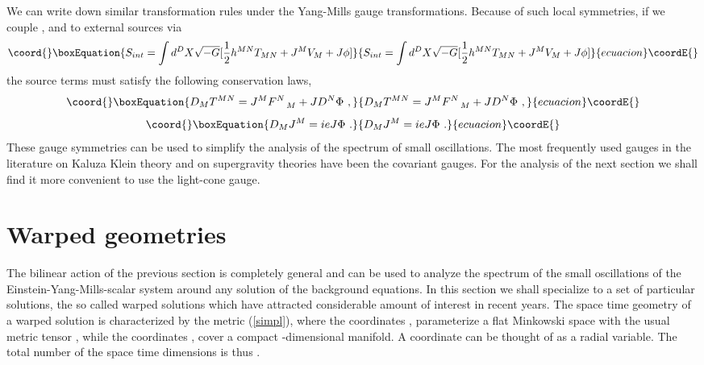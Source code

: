 \documentclass[a4paper,12pt]{article}
\begin{document}
We can write down similar transformation rules under the Yang-Mills
gauge transformations. Because of such local symmetries, if we couple
\coordHE{}, \coordHE{} and \myHighlight{$\phi$}\coordHE{} to external sources via
\begin{equation}\coord{}\boxEquation{
S_{int} =\int d^D X \sqrt{-G}[\frac{1}{2}h^{MN}T_{MN} +
J^MV_M+J \phi]
\label{coup}
}{
S_{int} =\int d^D X \sqrt{-G}[\frac{1}{2}h^{MN}T_{MN} +
J^MV_M+J \phi]
}{ecuacion}\coordE{}\end{equation}
the source terms must satisfy the following conservation
laws,
\begin{equation}\coord{}\boxEquation{
D_M T^{MN}= J^M F^N_{\quad M} + J D^N\Phi~,
\label{con1}
}{
D_M T^{MN}= J^M F^N_{\quad M} + J D^N\Phi~,
}{ecuacion}\coordE{}\end{equation}
\begin{equation}\coord{}\boxEquation{
D_M J^M= ie J\Phi~.
 \label{con2}
}{
D_M J^M= ie J\Phi~.
 }{ecuacion}\coordE{}\end{equation}
These gauge symmetries can be used to simplify the analysis of the
spectrum of small oscillations. The most frequently used gauges in
the literature on Kaluza Klein theory and on supergravity theories
have been the covariant gauges. For the analysis of the next section
we shall find it more convenient to use the light-cone gauge.

\section{Warped geometries}
The bilinear action of the previous section is completely general and
can be used to analyze the spectrum of the small oscillations of the
Einstein-Yang-Mills-scalar system around any solution of the
background equations. In this section we shall specialize to a set of
particular solutions, the so called warped solutions which have
attracted considerable amount of interest in recent years. The space
time geometry of a warped solution is characterized by the metric
(\ref{simpl}), where the coordinates \coordHE{}, \coordHE{}
parameterize a flat Minkowski space with the usual metric tensor
\coordHE{}, while the coordinates \coordHE{},
\coordHE{} cover a compact \coordHE{} -dimensional manifold. A
coordinate \coordHE{} can be thought of as a radial variable. The total
number of the space time dimensions is thus \coordHE{}.
\end{document}
